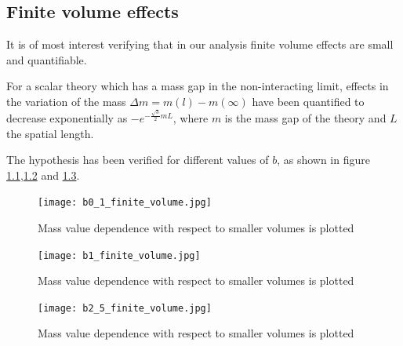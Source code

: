 \documentclass[12pt,a4paper]{report}
\begin{document}
\begin{appendices}
\chapter{Finite volume effects}

It is of most interest verifying that in our analysis finite volume effects are small and quantifiable.

For a scalar theory which has a mass gap in the non-interacting limit, effects in the variation of the mass $\Delta m = m(l)- m(\infty)$ have been quantified to decrease exponentially as $-e^{- \frac{\sqrt{3}}{2} m L } $, where $m$ is the mass gap of the theory and $L$ the spatial length\cite{luscher1986volume}.

The hypothesis has been verified for different values of $b$, as shown in figure \ref{fig:b0.1_finite_volume},\ref{fig:b1_finite_volume} and \ref{fig:b2.5_finite_volume}.

\begin{figure}
\centering
\texttt{[image: b0\_1\_finite\_volume.jpg]}
\caption{Mass value dependence with respect to smaller volumes is plotted}
\label{fig:b0.1_finite_volume}
\end{figure}

\begin{figure}
\centering
\texttt{[image: b1\_finite\_volume.jpg]}
\caption{Mass value dependence with respect to smaller volumes is plotted}
\label{fig:b1_finite_volume}
\end{figure}

\begin{figure}
\centering
\texttt{[image: b2\_5\_finite\_volume.jpg]}
\caption{Mass value dependence with respect to smaller volumes is plotted}
\label{fig:b2.5_finite_volume}
\end{figure}

\end{appendices}

 

\end{document}
